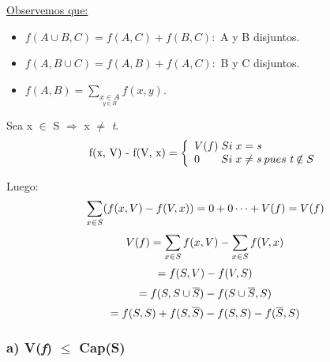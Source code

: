 \documentclass[12pt,a4paper]{report}
\newcounter{neq}
\begin{document}
		\underline{Observemos que:}
		\begin{itemize}
			\item $f(A \cup B, C) = f(A,C) + f(B,C):$ A y B disjuntos.
			\item $f(A, B \cup C) = f(A,B) + f(A,C):$ B y C disjuntos.
			\item $f(A,B) = \underset {\underset {y \in B} {x \in A}} \sum f(x,y).$
		\end{itemize}
		
		Sea x $\in$ S $\Rightarrow$ x $\neq$ \textit{t}.
		\begin{equation*}
			\textup{f(x, V) - f(V, x)} =
  			\left\lbrace
  			\begin{array}{l}
    		 V(f) \; Si \; x= \textit{s} \\
     		 0 \; \; \; \; \; \; \;  Si \; x \neq \textit{s} \; pues \; \textit{t} \notin S \\
  			\end{array}
 			 \right.
		\end{equation*}
		
		Luego:
		\begin{equation}
			\sum_{x \in S}(f(x, V) - f(V, x)) = 0 + 0 \dotsb + V(f) = V(f) \\
		\end{equation}
		\begin{equation}
			\vspace{5mm} \\
			V(f) = \sum_{x \in S}f(x, V) - \sum_{x \in S}f(V, x) \\
		\end{equation}
		\begin{equation}
			= f(S, V) - f(V, S) \\
		\end{equation}
        \begin{equation}
           = f(S, S \cup \overline{S}) - f(S \cup \overline{S}, S) \\
        \end{equation}
		\begin{equation}
			= f(S, S) + f(S, \overline{S}) - f(S, S) -  f(\overline{S}, S) \\
		\end{equation}
				
		\subsubsection{a) V(\textit{f}) $\leq$ Cap(S)}
			
		
		
\end{document}
